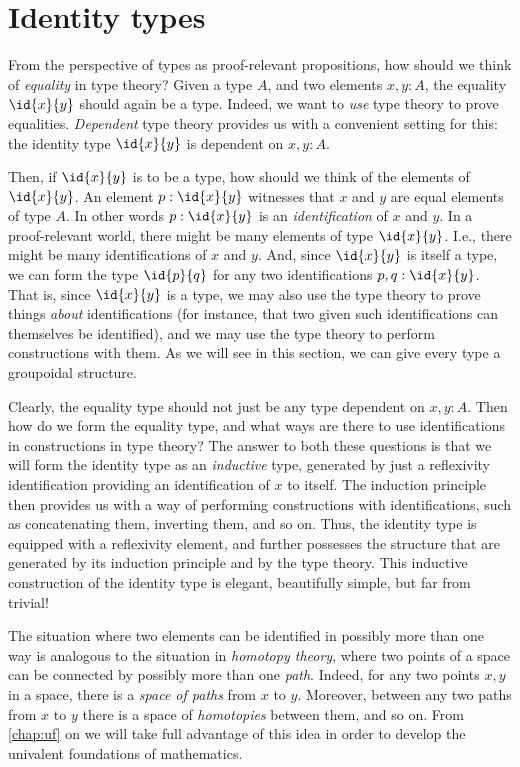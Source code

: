 \section{Identity types}\label{sec:identity}

From the perspective of types as proof-relevant propositions, how should we think of \emph{equality} in type theory? Given a type $A$, and two elements $x,y:A$, the equality $\id{x}{y}$ should again be a type. Indeed, we want to \emph{use} type theory to prove equalities. \emph{Dependent} type theory provides us with a convenient setting for this: the identity type $\id{x}{y}$ is dependent on $x,y:A$. 

Then, if $\id{x}{y}$ is to be a type, how should we think of the elements of $\id{x}{y}$. An element $p:\id{x}{y}$ witnesses that $x$ and $y$ are equal elements of type $A$. In other words $p:\id{x}{y}$ is an \emph{identification} of $x$ and $y$. In a proof-relevant world, there might be many elements of type $\id{x}{y}$. I.e., there might be many identifications of $x$ and $y$. And, since $\id{x}{y}$ is itself a type, we can form the type $\id{p}{q}$ for any two identifications $p,q:\id{x}{y}$. That is, since $\id{x}{y}$ is a type, we may also use the type theory to prove things \emph{about} identifications (for instance, that two given such identifications can themselves be identified), and we may use the type theory to perform constructions with them. As we will see in this section, we can give every type a groupoidal structure.

Clearly, the equality type should not just be any type dependent on $x,y:A$. Then how do we form the equality type, and what ways are there to use identifications in constructions in type theory? The answer to both these questions is that we will form the identity type as an \emph{inductive} type, generated by just a reflexivity identification providing an identification of $x$ to itself. The induction principle then provides us with a way of performing constructions with identifications, such as concatenating them, inverting them, and so on. Thus, the identity type is equipped with a reflexivity element, and further possesses the structure that are generated by its induction principle and by the type theory. This inductive construction of the identity type is elegant, beautifully simple, but far from trivial!

The situation where two elements can be identified in possibly more than one way is analogous to the situation in \emph{homotopy theory}, where two points of a space can be connected by possibly more than one \emph{path}. Indeed, for any two points $x,y$ in a space, there is a \emph{space of paths} from $x$ to $y$. Moreover, between any two paths from $x$ to $y$ there is a space of \emph{homotopies} between them, and so on. From \cref{chap:uf} on we will take full advantage of this idea in order to develop the univalent foundations of mathematics.

